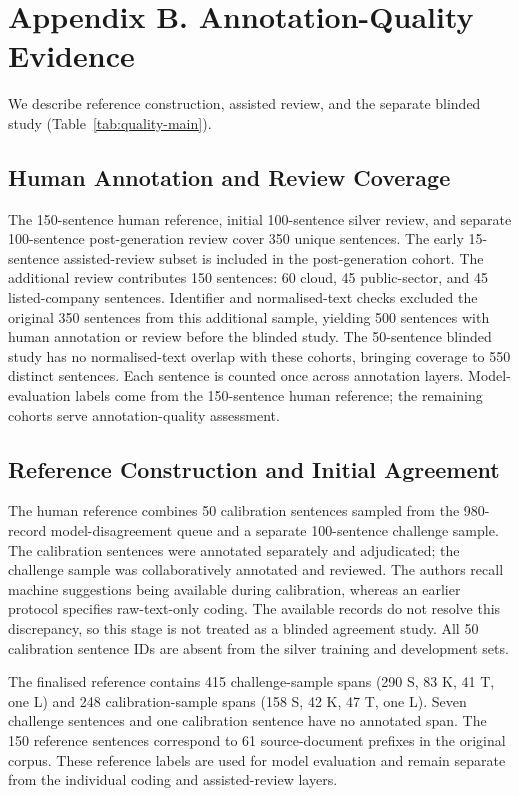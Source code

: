 \section{Appendix B. Annotation-Quality Evidence}
\label{app:b}
\label{sec:quality-provenance-r12}
We describe reference construction, assisted review, and the separate blinded study (Table~\ref{tab:quality-main}).

\subsection{Human Annotation and Review Coverage}
\label{sec:human-review-coverage}
The 150-sentence human reference, initial 100-sentence silver review, and separate 100-sentence post-generation review cover 350 unique sentences. The early 15-sentence assisted-review subset is included in the post-generation cohort. The additional review contributes 150 sentences: 60 cloud, 45 public-sector, and 45 listed-company sentences. Identifier and normalised-text checks excluded the original 350 sentences from this additional sample, yielding 500 sentences with human annotation or review before the blinded study. The 50-sentence blinded study has no normalised-text overlap with these cohorts, bringing coverage to 550 distinct sentences. Each sentence is counted once across annotation layers. Model-evaluation labels come from the 150-sentence human reference; the remaining cohorts serve annotation-quality assessment.

\subsection{Reference Construction and Initial Agreement}
The human reference combines 50 calibration sentences sampled from the 980-record model-disagreement queue and a separate 100-sentence challenge sample. The calibration sentences were annotated separately and adjudicated; the challenge sample was collaboratively annotated and reviewed. The authors recall machine suggestions being available during calibration, whereas an earlier protocol specifies raw-text-only coding. The available records do not resolve this discrepancy, so this stage is not treated as a blinded agreement study. All 50 calibration sentence IDs are absent from the silver training and development sets.

The finalised reference contains 415 challenge-sample spans (290 S, 83 K, 41 T, one L) and 248 calibration-sample spans (158 S, 42 K, 47 T, one L). Seven challenge sentences and one calibration sentence have no annotated span. The 150 reference sentences correspond to 61 source-document prefixes in the original corpus. These reference labels are used for model evaluation and remain separate from the individual coding and assisted-review layers.

